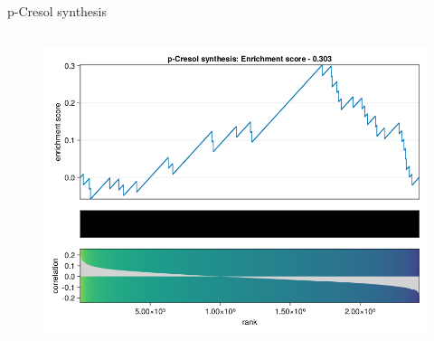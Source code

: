 \begin{frame}{p-Cresol synthesis}
    \begin{columns}[c] %

        \begin{figure}
            \includegraphics[width=1\linewidth]{../figures/fsea_p-Cresol-synthesis.png}
        \end{figure}

    \end{columns}

\end{frame}

